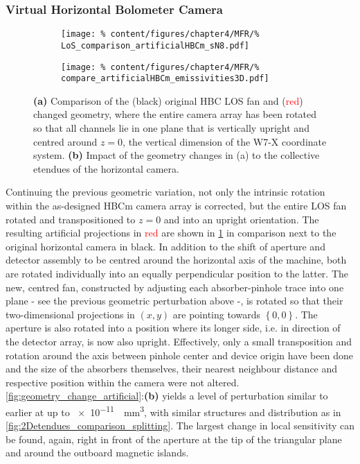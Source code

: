         \subsubsection*{Virtual Horizontal Bolometer Camera}%
%
            \begin{figure}[t]%
                \centering%
                \begin{subfigure}{0.4\textwidth}%
                    \texttt{[image: \%
                        content/figures/chapter4/MFR/\%
                        LoS\_comparison\_artificialHBCm\_sN8.pdf]}%
                    \caption{}%
                \end{subfigure}%
                \hfill%
                \begin{subfigure}{0.55\textwidth}%
                    \texttt{[image: \%
                        content/figures/chapter4/MFR/\%
                        compare\_artificialHBCm\_emissivities3D.pdf]}%
                    \caption{}%
                \end{subfigure}%
                \caption{\textbf{(a)} Comparison of the (black) original HBC LOS fan and (\textcolor{red}{red}) changed geometry, where the entire camera array has been rotated so that all channels lie in one plane that is vertically upright and centred around $z=0$, the vertical dimension of the W7-X coordinate system. \textbf{(b)} Impact of the geometry changes in (a) to the collective etendues of the horizontal camera.}\label{fig:geometry_change_artificial}%
            \end{figure}%
%
            Continuing the previous geometric variation, not only the intrinsic rotation within the as-designed HBCm camera array is corrected, but the entire LOS fan rotated and transpositioned to $z=0$ and into an upright orientation. The resulting artificial projections in \textcolor{red}{red} are shown in \cref{fig:geometry_change_artificial} in comparison next to the original horizontal camera in black. In addition to the shift of aperture and detector assembly to be centred around the horizontal axis of the machine, both are rotated individually into an equally perpendicular position to the latter. The new, centred fan, constructed by adjusting each absorber-pinhole trace into one plane - see the previous geometric perturbation above -, is rotated so that their two-dimensional projections in $\left(x,y\right)$ are pointing towards $\left\{0,0\right\}$. The aperture is also rotated into a position where its longer side, i.e. in direction of the detector array, is now also upright. Effectively, only a small transposition and rotation around the axis between pinhole center and device origin have been done and the size of the absorbers themselves, their nearest neighbour distance and respective position within the camera were not altered. \autoref{fig:geometry_change_artificial}:\textbf{(b)} yields a level of perturbation similar to earlier at up to \SI[per-mode=reciprocal]{e-11}{\per\cubic\milli\meter}, with similar structures and distribution as in \cref{fig:2Detendues_comparison_splitting}. The largest change in local sensitivity can be found, again, right in front of the aperture at the tip of the triangular plane and around the outboard magnetic islands.\\%
